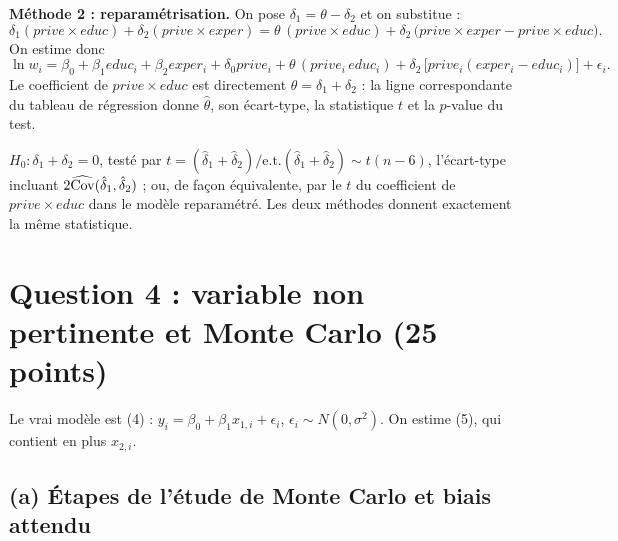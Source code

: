 \documentclass[11pt,a4paper]{article}
\begin{document}
\textbf{Méthode 2 : reparamétrisation.} On pose $\delta_1=\theta-\delta_2$ et on substitue :
\[
\delta_1(prive\times educ)+\delta_2(prive\times exper)
=\theta\,(prive\times educ)+\delta_2\,\big(prive\times exper-prive\times educ\big).
\]
On estime donc
\[
\ln w_i=\beta_0+\beta_1 educ_i+\beta_2 exper_i+\delta_0 prive_i+\theta\,(prive_i\, educ_i)+\delta_2\,\big[prive_i(exper_i-educ_i)\big]+\epsilon_i .
\]
Le coefficient de $prive\times educ$ est directement $\theta=\delta_1+\delta_2$ : la ligne correspondante du tableau de régression donne $\hat\theta$, son écart-type, la statistique $t$ et la $p$-value du test.

\begin{reponse}
$H_0:\delta_1+\delta_2=0$, testé par $t=(\hat\delta_1+\hat\delta_2)/\text{e.t.}(\hat\delta_1+\hat\delta_2)\sim t(n-6)$, l'écart-type incluant $2\widehat{\operatorname{Cov}}(\hat\delta_1,\hat\delta_2)$ ; ou, de façon équivalente, par le $t$ du coefficient de $prive\times educ$ dans le modèle reparamétré. Les deux méthodes donnent exactement la même statistique.
\end{reponse}

\section{Question 4 : variable non pertinente et Monte Carlo (25 points)}

Le vrai modèle est (4) : $y_i=\beta_0+\beta_1x_{1,i}+\epsilon_i$, $\epsilon_i\sim N(0,\sigma^2)$. On estime (5), qui contient en plus $x_{2,i}$.

\subsection*{(a) Étapes de l'étude de Monte Carlo et biais attendu}
\end{document}
